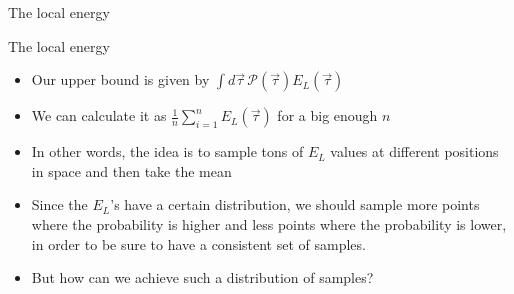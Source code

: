 \documentclass[10pt, compress, usetitleprogressbar, protectframetitle, handout]{beamer}
\begin{document}
\begin{frame}{The local energy}
	
	
	
	
	
	

\end{frame}

\begin{frame}{The local energy}
	
	
	\begin{itemize}[<+->]
		\item Our upper bound is given by $\int d\vec{\tau}\,\mathcal{P}(\vec{\tau})E_L(\vec{\tau})$
		\item We can calculate it as $\frac{1}{n}\sum_{i=1}^{n}E_L(\vec{\tau})$ for a big enough $n$
		\item In other words, the idea is to sample tons of $E_L$ values at different positions in space and then take the mean
		\item Since the $E_L$'s have a certain distribution, we should sample more points where the probability is higher and less points where the probability is lower, in order to be sure to have a consistent set of samples.
		\item \alert{But how can we achieve such a distribution of samples?}
	\end{itemize}
	
\end{frame}
\end{document}
